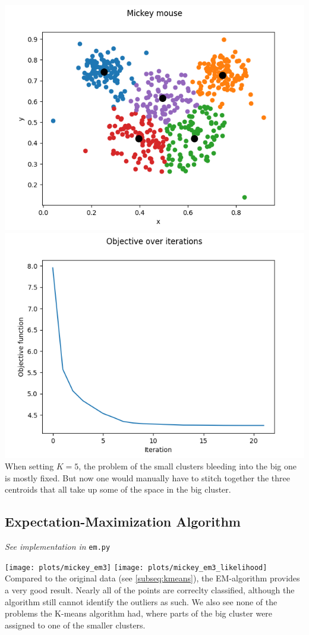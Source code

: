     \includegraphics[width=\textwidth / 2]{plots/mickey_k5}
    \includegraphics[width=\textwidth / 2]{plots/mickey_k5_loss}
    When setting $K=5$, the problem of the small clusters bleeding into the big one is mostly fixed.
    But now one would manually have to stitch together the three centroids that all take up some of the space in the big cluster.

    \subsection{Expectation-Maximization Algorithm}
    \textit{See implementation in} \texttt{em.py}

    \texttt{[image: plots/mickey\_em3]}
    \texttt{[image: plots/mickey\_em3\_likelihood]}
    Compared to the original data (see \ref{subseq:kmeans}), the EM-algorithm provides a very good result.
    Nearly all of the points are correclty classified, although the algorithm still cannot identify the outliers as such.
    We also see none of the problems the K-means algorithm had, where parts of the big cluster were assigned to one of the smaller clusters.

